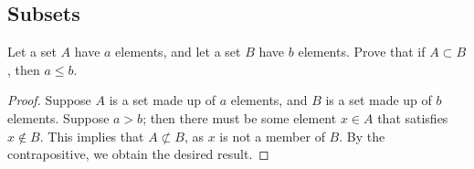 \subsection{Subsets}%
				\begin{majorEx}%
					Let a set $ A $ have $a$ elements, and let a set $B$ have $b$ elements. Prove that if $A \subset B $, then $a\leq b$.
				\end{majorEx}
				\begin{proof}
					Suppose  $ A $ is a set made up of $a$ elements, and $B$ is a set made up of $b$ elements. Suppose $a > b$; then there must be some element $x \in A$ that satisfies $x \notin B$. This implies that $A \not\subset B$, as $x$ is not a member of $B$. By the contrapositive, we obtain the desired result.
				\end{proof}


